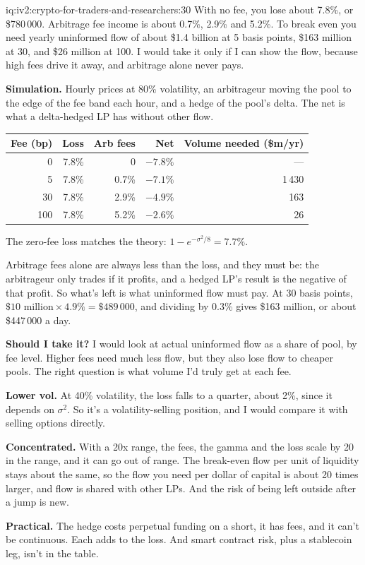 \begin{solution}{iq:iv2:crypto-for-traders-and-researchers:30}
With no fee, you lose about 7.8\%, or \$780\,000. Arbitrage fee income is about 0.7\%, 2.9\% and 5.2\%. To break even you need yearly uninformed flow of about \$1.4 billion at 5 basis points, \$163 million at 30, and \$26 million at 100. I would take it only if I can show the flow, because high fees drive it away, and arbitrage alone never pays.

\textbf{Simulation.} Hourly prices at 80\% volatility, an arbitrageur moving the pool to the edge of the fee band each hour, and a hedge of the pool's delta. The net is what a delta-hedged LP has without other flow.

\begin{center}
\begin{tabular}{rrrrr}
\toprule
Fee (bp) & Loss & Arb fees & Net & Volume needed (\$m/yr) \\
\midrule
0 & 7.8\% & 0 & $-7.8\%$ & --- \\
5 & 7.8\% & 0.7\% & $-7.1\%$ & 1\,430 \\
30 & 7.8\% & 2.9\% & $-4.9\%$ & 163 \\
100 & 7.8\% & 5.2\% & $-2.6\%$ & 26 \\
\bottomrule
\end{tabular}
\end{center}

The zero-fee loss matches the theory: $1 - e^{-\sigma^2/8} = 7.7\%$.

Arbitrage fees alone are always less than the loss, and they must be: the arbitrageur only trades if it profits, and a hedged LP's result is the negative of that profit. So what's left is what uninformed flow must pay. At 30 basis points, $\$10 \text{ million} \times 4.9\% = \$489\,000$, and dividing by 0.3\% gives \$163 million, or about \$447\,000 a day.

\textbf{Should I take it?} I would look at actual uninformed flow as a share of pool, by fee level. Higher fees need much less flow, but they also lose flow to cheaper pools. The right question is what volume I'd truly get at each fee.

\textbf{Lower vol.} At 40\% volatility, the loss falls to a quarter, about 2\%, since it depends on $\sigma^2$. So it's a volatility-selling position, and I would compare it with selling options directly.

\textbf{Concentrated.} With a 20x range, the fees, the gamma and the loss scale by 20 in the range, and it can go out of range. The break-even flow per unit of liquidity stays about the same, so the flow you need per dollar of capital is about 20 times larger, and flow is shared with other LPs. And the risk of being left outside after a jump is new.

\textbf{Practical.} The hedge costs perpetual funding on a short, it has fees, and it can't be continuous. Each adds to the loss. And smart contract risk, plus a stablecoin leg, isn't in the table.

\end{solution}
